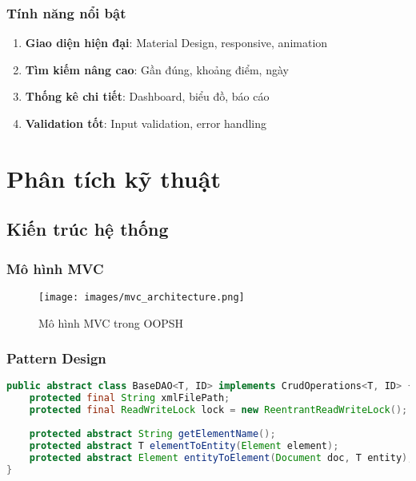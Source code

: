 \documentclass[12pt,a4paper]{article}
\begin{document}
\subsubsection{Tính năng nổi bật}

\begin{enumerate}
    \item \textbf{Giao diện hiện đại}: Material Design, responsive, animation
    \item \textbf{Tìm kiếm nâng cao}: Gần đúng, khoảng điểm, ngày
    \item \textbf{Thống kê chi tiết}: Dashboard, biểu đồ, báo cáo
    \item \textbf{Validation tốt}: Input validation, error handling
\end{enumerate}

\section{Phân tích kỹ thuật}

\subsection{Kiến trúc hệ thống}

\subsubsection{Mô hình MVC}

\begin{figure}[H]
\centering
\texttt{[image: images/mvc\_architecture.png]}
\caption{Mô hình MVC trong OOPSH}
\label{fig:mvc_architecture}
\end{figure}

\subsubsection{Pattern Design}

\begin{lstlisting}[language=Java, caption=DAO Pattern]
public abstract class BaseDAO<T, ID> implements CrudOperations<T, ID> {
    protected final String xmlFilePath;
    protected final ReadWriteLock lock = new ReentrantReadWriteLock();
    
    protected abstract String getElementName();
    protected abstract T elementToEntity(Element element);
    protected abstract Element entityToElement(Document doc, T entity);
}
\end{lstlisting}
\end{document}
